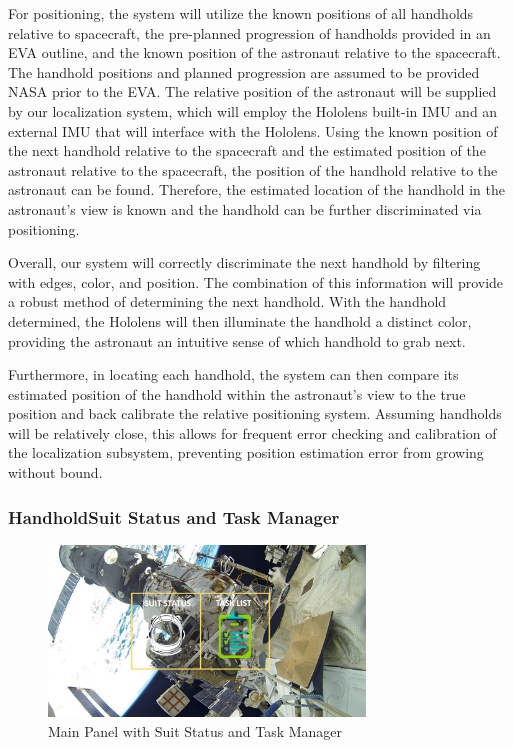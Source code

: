 \documentclass{article}
\let\Oldsubsubsection\subsubsection
\renewcommand{\subsubsection}{\FloatBarrier\Oldsubsubsection}
\begin{document}
For positioning, the system will utilize the known positions of all handholds relative to spacecraft, the pre-planned progression of handholds provided in an EVA outline, and the known position of the astronaut relative to the spacecraft. The handhold positions and planned progression are assumed to be provided NASA prior to the EVA. The relative position of the astronaut will be supplied by our localization system, which will employ the Hololens built-in IMU and an external IMU that will interface with the Hololens. Using the known position of the next handhold relative to the spacecraft and the estimated position of the astronaut relative to the spacecraft, the position of the handhold relative to the astronaut can be found. Therefore, the estimated location of the handhold in the astronaut’s view is known and the handhold can be further discriminated via positioning.

Overall, our system will correctly discriminate the next handhold by filtering with edges, color, and position. The combination of this information will provide a robust method of determining the next handhold. With the handhold determined, the Hololens will then illuminate the handhold a distinct color, providing the astronaut an intuitive sense of which handhold to grab next.

Furthermore, in locating each handhold, the system can then compare its estimated position of the handhold within the astronaut’s view to the true position and back calibrate the relative positioning system. Assuming handholds will be relatively close, this allows for frequent error checking and calibration of the localization subsystem, preventing position estimation error from growing without bound.

\subsubsection{HandholdSuit Status and Task Manager}

\begin{figure}[!htb]
  \centering
  \includegraphics[width=0.75\textwidth]{assets/suitdatatasklist.png}
  \caption{Main Panel with Suit Status and Task Manager}
  \label{fig:suitdatatasklist}
\end{figure}
\end{document}

